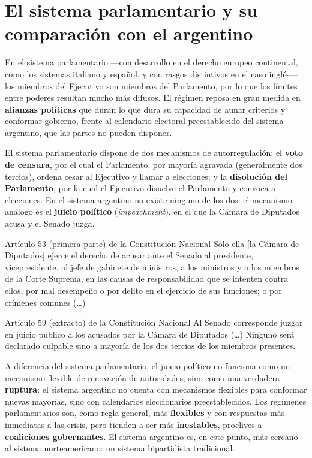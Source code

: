 \documentclass[12pt,oneside]{book}
\begin{document}
\section{El sistema parlamentario y su comparación con el argentino}
\label{sec:parlamentario}

En el sistema parlamentario ---con desarrollo en el derecho europeo continental, como los sistemas italiano y español, y con rasgos distintivos en el caso inglés--- los miembros del Ejecutivo son miembros del Parlamento, por lo que los límites entre poderes resultan mucho más difusos. El régimen reposa en gran medida en \textbf{alianzas políticas} que duran lo que dura su capacidad de aunar criterios y conformar gobierno, frente al calendario electoral preestablecido del sistema argentino, que las partes no pueden disponer.

El sistema parlamentario dispone de dos mecanismos de autorregulación: el \textbf{voto de censura}, por el cual el Parlamento, por mayoría agravada (generalmente dos tercios), ordena cesar al Ejecutivo y llamar a elecciones; y la \textbf{disolución del Parlamento}, por la cual el Ejecutivo disuelve el Parlamento y convoca a elecciones. En el sistema argentino no existe ninguno de los dos: el mecanismo análogo es el \textbf{juicio político} (\emph{impeachment}), en el que la Cámara de Diputados acusa y el Senado juzga.

\begin{norma}{Artículo 53 (primera parte) de la Constitución Nacional}
Sólo ella [la Cámara de Diputados] ejerce el derecho de acusar ante el Senado al presidente, vicepresidente, al jefe de gabinete de ministros, a los ministros y a los miembros de la Corte Suprema, en las causas de responsabilidad que se intenten contra ellos, por mal desempeño o por delito en el ejercicio de sus funciones; o por crímenes comunes (\ldots)
\end{norma}

\begin{norma}{Artículo 59 (extracto) de la Constitución Nacional}
Al Senado corresponde juzgar en juicio público a los acusados por la Cámara de Diputados (\ldots) Ninguno será declarado culpable sino a mayoría de los dos tercios de los miembros presentes.
\end{norma}

A diferencia del sistema parlamentario, el juicio político no funciona como un mecanismo flexible de renovación de autoridades, sino como una verdadera \textbf{ruptura}: el sistema argentino no cuenta con mecanismos flexibles para conformar nuevas mayorías, sino con calendarios eleccionarios preestablecidos. Los regímenes parlamentarios son, como regla general, más \textbf{flexibles} y con respuestas más inmediatas a las crisis, pero tienden a ser más \textbf{inestables}, proclives a \textbf{coaliciones gobernantes}. El sistema argentino es, en este punto, más cercano al sistema norteamericano: un sistema bipartidista tradicional.
\end{document}
